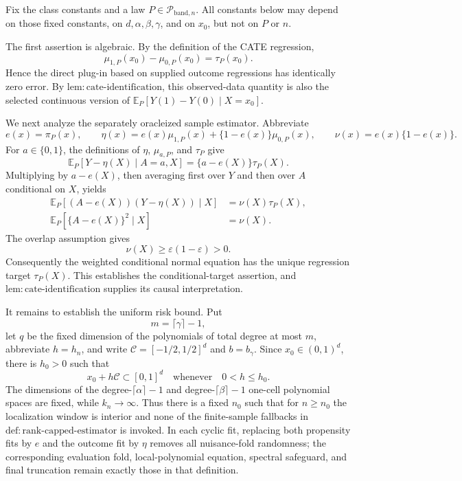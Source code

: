 Fix the class constants and a law \(P\in\mathcal P_{\mathrm{band},n}\).  All constants below may depend on those fixed constants, on \(d,\alpha,\beta,\gamma\), and on \(x_0\), but not on \(P\) or \(n\).

The first assertion is algebraic.  By the definition of the CATE regression,
\[
\mu_{1,P}(x_0)-\mu_{0,P}(x_0)=\tau_P(x_0).
\]
Hence the direct plug-in based on supplied outcome regressions has identically zero error.  By \(\mathrm{lem:cate\mbox{-}identification}\), this observed-data quantity is also the selected continuous version of \(\mathbb E_P[Y(1)-Y(0)\mid X=x_0]\).

We next analyze the separately oracleized sample estimator.  Abbreviate
\[
e(x)=\pi_P(x),\qquad
\eta(x)=e(x)\mu_{1,P}(x)+\{1-e(x)\}\mu_{0,P}(x),
\qquad
\nu(x)=e(x)\{1-e(x)\}.
\]
For \(a\in\{0,1\}\), the definitions of \(\eta\), \(\mu_{a,P}\), and \(\tau_P\) give
\[
\mathbb E_P[Y-\eta(X)\mid A=a,X]
=\{a-e(X)\}\tau_P(X).
\]
Multiplying by \(a-e(X)\), then averaging first over \(Y\) and then over \(A\) conditional on \(X\), yields
\[
\begin{aligned}
\mathbb E_P[(A-e(X))(Y-\eta(X))\mid X]
&=\nu(X)\tau_P(X),\\
\mathbb E_P[\{A-e(X)\}^2\mid X]
&=\nu(X).
\end{aligned}
\]
The overlap assumption gives
\[
\nu(X)\geq\varepsilon(1-\varepsilon)>0.
\]
Consequently the weighted conditional normal equation has the unique regression target \(\tau_P(X)\).  This establishes the conditional-target assertion, and \(\mathrm{lem:cate\mbox{-}identification}\) supplies its causal interpretation.

It remains to establish the uniform risk bound.  Put
\[
m=\lceil\gamma\rceil-1,
\]
let \(q\) be the fixed dimension of the polynomials of total degree at most \(m\), abbreviate \(h=h_n\), and write \(\mathcal C=[-1/2,1/2]^d\) and \(b=b_\gamma\).  Since \(x_0\in(0,1)^d\), there is \(h_0>0\) such that
\[
x_0+h\mathcal C\subset[0,1]^d
\quad\text{whenever}\quad 0<h\leq h_0.
\]
The dimensions of the degree-\(\lceil\alpha\rceil-1\) and degree-\(\lceil\beta\rceil-1\) one-cell polynomial spaces are fixed, while \(k_n\to\infty\).  Thus there is a fixed \(n_0\) such that for \(n\geq n_0\) the localization window is interior and none of the finite-sample fallbacks in \(\mathrm{def:rank\mbox{-}capped\mbox{-}estimator}\) is invoked.  In each cyclic fit, replacing both propensity fits by \(e\) and the outcome fit by \(\eta\) removes all nuisance-fold randomness; the corresponding evaluation fold, local-polynomial equation, spectral safeguard, and final truncation remain exactly those in that definition.


